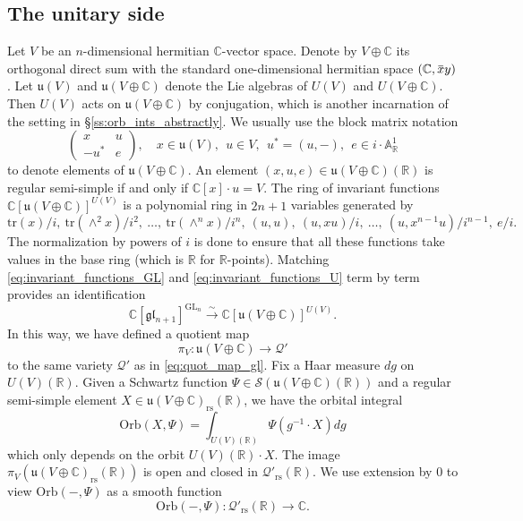 \documentclass[reqno, 11pt]{amsart} %
\numberwithin{equation}{section}
\theoremstyle{plain}
\theoremstyle{definition}
\theoremstyle{remark}
\newcommand{\overbar}[1]{\mkern 1.5mu\overline{\mkern-1.5mu#1\mkern-1.5mu}\mkern 1.5mu}
\newcommand{\mr}{\mathrm}
\newcommand{\tr}{\mathrm{tr}}
\newcommand{\lr}{\longrightarrow}
\newcommand{\mbA}{\mathbb{A}}
\newcommand{\mbC}{\mathbb{C}}
\newcommand{\mbR}{\mathbb{R}}
\newcommand{\mcQ}{\mathcal{Q}}
\newcommand{\mcS}{\mathcal{S}}
\newcommand{\mfg}{\mathfrak{g}}
\newcommand{\mfl}{\mathfrak{l}}
\newcommand{\mfu}{\mathfrak{u}}
\newcommand{\rs}{\mr{rs}}
\newcommand{\mfgl}{\mfg\mfl}
\newcommand{\simlr}{\overset{\sim}{\lr}}
\newcommand{\bbC}{\mathbb C}
\newcommand{\bbR}{\mathbb R}
\DeclareMathOperator{\GL}{GL}
\newcommand{\Orb}{\mathrm{Orb}}
\begin{document}
\subsection{The unitary side}
Let $V$ be an $n$-dimensional hermitian $\mbC$-vector space. Denote by $V\oplus \mbC$ its orthogonal direct sum with the standard one-dimensional hermitian space $(\mbC, \overbar x y)$. Let $\mfu(V)$ and $\mfu(V\oplus \mbC)$ denote the Lie algebras of $U(V)$ and $U(V\oplus \mbC)$. Then $U(V)$ acts on $\mfu(V\oplus \mbC)$ by conjugation, which is another incarnation of the setting in \S\ref{ss:orb_ints_abstractly}. We usually use the block matrix notation
\begin{equation}\label{eq:standard_notation_U}
\begin{pmatrix}
x & u\\ -u^* & e
\end{pmatrix},\quad x\in \mfu(V),\ \ u \in V,\ \ u^* = (u,-),\ \ e\in i\cdot \mbA^1_\mbR
\end{equation}
to denote elements of $\mfu(V\oplus \mbC)$. An element $(x,u,e)\in \mfu(V\oplus \bbC)(\mbR)$ is regular semi-simple if and only if $\mbC[x]\cdot u = V$. The ring of invariant functions $\mbC[\mfu(V\oplus \mbC)]^{U(V)}$ is a polynomial ring in $2n+1$ variables generated by
\begin{equation}\label{eq:invariant_functions_U}
\tr(x)/i,\ \tr(\wedge^2 x)/i^2,\ \ldots,\ \tr(\wedge^n x)/i^n,\ (u,u),\ (u,xu)/i,\ \ldots,\ (u,x^{n-1}u)/i^{n-1},\ e/i.
\end{equation}
The normalization by powers of $i$ is done to ensure that all these functions take values in the base ring (which is $\mbR$ for $\mbR$-points). Matching \eqref{eq:invariant_functions_GL} and \eqref{eq:invariant_functions_U} term by term provides an identification
\begin{equation}\label{eq:ident_inv_functions}
\mbC[\mfgl_{n+1}]^{\GL_n} \simlr \mbC[\mfu(V\oplus \mbC)]^{U(V)}.
\end{equation}
In this way, we have defined a quotient map
$$π_V:\mfu(V\oplus \mbC)\lr \mcQ'$$
to the same variety $\mcQ'$ as in \eqref{eq:quot_map_gl}.  Fix a Haar measure $dg$ on $U(V)(\bbR)$. Given a Schwartz function $Ψ\in \mcS(\mfu(V\oplus \mbC)(\mbR))$ and a regular semi-simple element $X\in \mfu(V\oplus \mbC)_\rs(\mbR)$, we have the orbital integral
$$\Orb(X, Ψ) = \int_{U(V)(\mbR)} Ψ(g^{-1}\cdot X) dg$$
which only depends on the orbit $U(V)(\mbR)\cdot X$. The image $π_V(\mfu(V\oplus \mbC)_\rs(\mbR))$ is open and closed in $\mcQ'_\rs(\mbR)$. We use extension by $0$ to view $\Orb(-,Ψ)$ as a smooth function
$$\Orb(-,Ψ):\mcQ'_\rs(\mbR) \lr \mbC.$$
\end{document}
